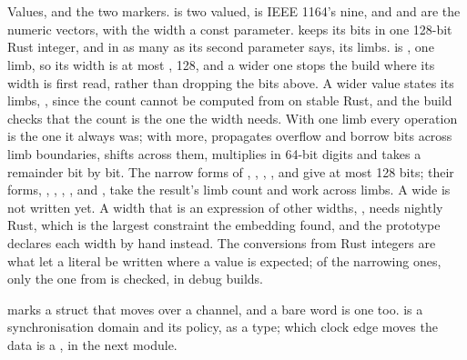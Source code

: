 \section{}
\label{sec:r-types}

Values, and the two markers.  is two valued,  is
IEEE 1164's nine, and  and  are the numeric
vectors, with the width a const parameter.  keeps its bits in
one 128-bit Rust integer, and  in as many as its second
parameter says, its limbs.  is , one limb, so
its width is at most , 128, and a wider one
stops the build where its width is first read, rather than dropping
the bits above. A wider value states its limbs,
, since the count cannot be computed from  on
stable Rust, and the build checks that the count is the one the width
needs. With one limb every operation is the  one it always
was; with more,  propagates overflow and borrow bits across limb
boundaries, shifts across them, multiplies in 64-bit digits and takes a
remainder bit by bit. The narrow forms of , ,
, ,  and  give at most 128
bits; their  forms, , ,
, ,  and
, take the result's limb count and work across limbs. A
wide  is not written yet. A width
that is an
expression of other widths, , needs nightly Rust,
which is the largest constraint the embedding found, and the
prototype declares each width by hand instead. The conversions from
Rust integers are what let a literal be written where a value is
expected; of the narrowing ones, only the one from  is
checked, in debug builds.

 marks a struct that moves over a channel, and a
bare word is one too.  is a synchronisation domain and its
policy, as a type; which clock edge moves the data is a
, in the next module.



\section{}
\label{sec:r-netlist}

